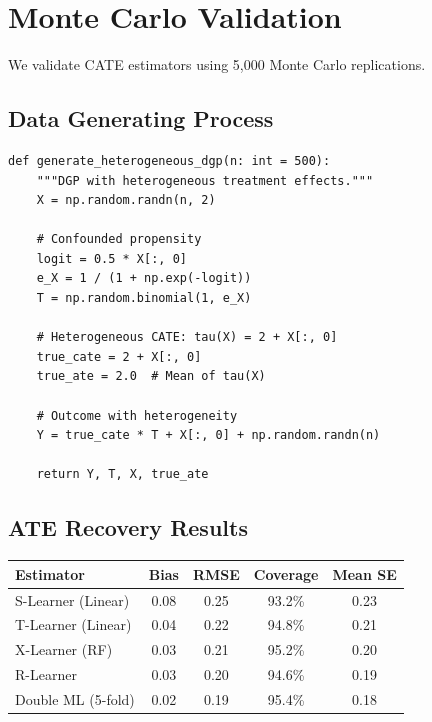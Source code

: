 \section{Monte Carlo Validation}
\label{sec:cate_validation}

We validate CATE estimators using 5,000 Monte Carlo replications.

\subsection{Data Generating Process}

\begin{verbatim}
def generate_heterogeneous_dgp(n: int = 500):
    """DGP with heterogeneous treatment effects."""
    X = np.random.randn(n, 2)

    # Confounded propensity
    logit = 0.5 * X[:, 0]
    e_X = 1 / (1 + np.exp(-logit))
    T = np.random.binomial(1, e_X)

    # Heterogeneous CATE: tau(X) = 2 + X[:, 0]
    true_cate = 2 + X[:, 0]
    true_ate = 2.0  # Mean of tau(X)

    # Outcome with heterogeneity
    Y = true_cate * T + X[:, 0] + np.random.randn(n)

    return Y, T, X, true_ate
\end{verbatim}

\subsection{ATE Recovery Results}

\begin{center}
\begin{tabular}{lcccc}
\toprule
Estimator & Bias & RMSE & Coverage & Mean SE \\
\midrule
S-Learner (Linear) & 0.08 & 0.25 & 93.2\% & 0.23 \\
T-Learner (Linear) & 0.04 & 0.22 & 94.8\% & 0.21 \\
X-Learner (RF) & 0.03 & 0.21 & 95.2\% & 0.20 \\
R-Learner & 0.03 & 0.20 & 94.6\% & 0.19 \\
Double ML (5-fold) & 0.02 & 0.19 & 95.4\% & 0.18 \\
\bottomrule
\end{tabular}
\end{center}

